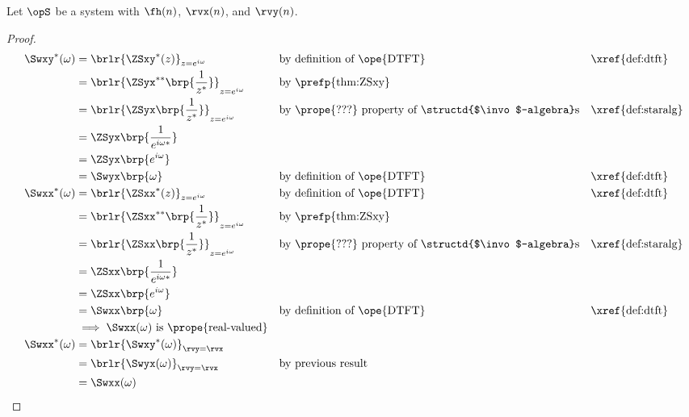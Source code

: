 \begin{corollary}
\label{cor:Swxy_sym}
Let $\opS$ be a system with  $\fh(n)$,
 $\rvx(n)$, and  $\rvy(n)$.
\end{corollary}
\begin{proof}
\begin{align*}
   \Swxy^\ast(\omega)
     &= \brlr{\ZSxy^\ast(z)}_{z=e^{i\omega}}
     && \text{by definition of \ope{DTFT}}
     && \text{\xref{def:dtft}}
   \\&= \brlr{\ZSyx^{\ast\ast}\brp{\frac{1}{z^\ast}}}_{z=e^{i\omega}}
     && \text{by \prefp{thm:ZSxy}}
   \\&= \brlr{\ZSyx\brp{\frac{1}{z^\ast}}}_{z=e^{i\omega}}
     && \text{by \prope{???} property of \structd{$\invo$-algebra}s}
     && \text{\xref{def:staralg}}
   \\&= \ZSyx\brp{\frac{1}{e^{i\omega\ast}}}
   \\&= \ZSyx\brp{e^{i\omega}}
   \\&= \Swyx\brp{\omega}
     && \text{by definition of \ope{DTFT}}
     && \text{\xref{def:dtft}}
   \\
   \Swxx^\ast(\omega)
     &= \brlr{\ZSxx^\ast(z)}_{z=e^{i\omega}}
     && \text{by definition of \ope{DTFT}}
     && \text{\xref{def:dtft}}
   \\&= \brlr{\ZSxx^{\ast\ast}\brp{\frac{1}{z^\ast}}}_{z=e^{i\omega}}
     && \text{by \prefp{thm:ZSxy}}
   \\&= \brlr{\ZSxx\brp{\frac{1}{z^\ast}}}_{z=e^{i\omega}}
     && \text{by \prope{???} property of \structd{$\invo$-algebra}s}
     && \text{\xref{def:staralg}}
   \\&= \ZSxx\brp{\frac{1}{e^{i\omega\ast}}}
   \\&= \ZSxx\brp{e^{i\omega}}
   \\&= \Swxx\brp{\omega}
     && \text{by definition of \ope{DTFT}}
     && \text{\xref{def:dtft}}
   \\&\implies\text{$\Swxx(\omega)$ is \prope{real-valued}}
   \\
   \Swxx^\ast(\omega)
     &= \brlr{\Swxy^\ast(\omega)}_{\rvy=\rvx}
   \\&= \brlr{\Swyx(\omega)}_{\rvy=\rvx}
     && \text{by previous result}
   \\&= \Swxx(\omega)
\end{align*}
\end{proof}

